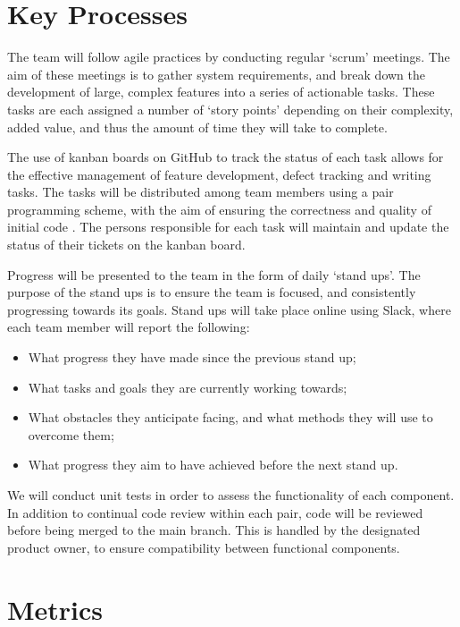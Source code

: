 \section{Key Processes}
The team will follow agile practices by conducting regular `scrum’ meetings. The aim of these meetings is to gather system requirements, and break down the development of large, complex features into a series of actionable tasks. These tasks are each assigned a number of `story points’ depending on their complexity, added value, and thus the amount of time they will take to complete.

The use of kanban boards on GitHub to track the status of each task allows for the effective management of feature development, defect tracking and writing tasks. The tasks will be distributed among team members using a pair programming scheme, with the aim of ensuring the correctness and quality of initial code \cite{hannay2009effectiveness}. The persons responsible for each task will maintain and update the status of their tickets on the kanban board.

Progress will be presented to the team in the form of daily `stand ups’. The purpose of the stand ups is to ensure the team is focused, and consistently progressing towards its goals. Stand ups will take place online using Slack, where each team member will report the following:

\begin{itemize}[noitemsep,topsep=0pt]
	\item What progress they have made since the previous stand up;
	\item What tasks and goals they are currently working towards;
	\item What obstacles they anticipate facing, and what methods they will use to overcome them;
	\item What progress they aim to have achieved before the next stand up.
\end{itemize}

We will conduct unit tests in order to assess the functionality of each component. In addition to continual code review within each pair, code will be reviewed before being merged to the main branch. This is handled by the designated product owner, to ensure compatibility between functional components.

\section{Metrics}

